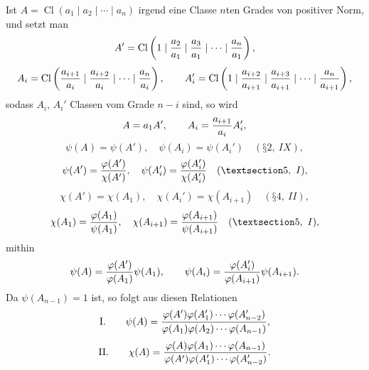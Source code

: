 \documentclass[11pt,a4paper]{article}
\newcommand{\Cl}{\operatorname{Cl}}
\begin{document}
Ist $A=\Cl(a_1\mid a_2\mid\cdots\mid a_n)$ irgend eine Classe $n$ten Grades von positiver Norm, und setzt man
\[
 A'=\Cl\left(1\mid {a_2\over a_1}\mid {a_3\over a_1}\mid\cdots\mid {a_n\over a_1}\right),
\]
\[
 A_i=\Cl\left({a_{i+1}\over a_i}\mid {a_{i+2}\over a_i}\mid\cdots\mid {a_n\over a_i}\right),
\qquad
 A_i'=\Cl\left(1\mid {a_{i+2}\over a_{i+1}}\mid {a_{i+3}\over a_{i+1}}\mid\cdots\mid {a_n\over a_{i+1}}\right),
\]
sodass $A_i$, $A_i'$ Classen vom Grade $n-i$ sind, so wird
\[
 A=a_1A',\qquad A_i={a_{i+1}\over a_i}A_i',
\]
\[
 \psi(A)=\psi(A'),\quad \psi(A_i)=\psi(A_i')\quad (§ 2,\ IX),
\]
\[
 \psi(A')={\varphi(A')\over\chi(A')},\quad
 \psi(A_i')={\varphi(A_i')\over\chi(A_i')}\quad (§ 5,\ I),
\]
\[
 \chi(A')=\chi(A_1),\quad \chi(A_i')=\chi(A_{i+1})\quad (§ 4,\ II),
\]
\[
 \chi(A_1)={\varphi(A_1)\over\psi(A_1)},\quad
 \chi(A_{i+1})={\varphi(A_{i+1})\over\psi(A_{i+1})}\quad (§ 5,\ I),
\]
mithin
\[
 \psi(A)={\varphi(A')\over\varphi(A_1)}\psi(A_1),
 \qquad
 \psi(A_i)={\varphi(A_i')\over\varphi(A_{i+1})}\psi(A_{i+1}).
\]
Da $\psi(A_{n-1})=1$ ist, so folgt aus diesen Relationen
\[
\text{I.}\qquad
 \psi(A)={\varphi(A')\varphi(A_1')\cdots\varphi(A_{n-2}')
 \over
 \varphi(A_1)\varphi(A_2)\cdots\varphi(A_{n-1})},
\]
\[
\text{II.}\qquad
 \chi(A)={\varphi(A)\varphi(A_1)\cdots\varphi(A_{n-1})
 \over
 \varphi(A')\varphi(A_1')\cdots\varphi(A_{n-2}')}.
\]
\end{document}
